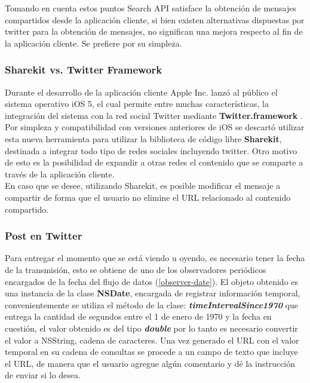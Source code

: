 Tomando en cuenta estos puntos Search API satisface la obtención de mensajes compartidos desde la aplicación cliente, si bien existen alternativas dispuestas por twitter para la obtención de mensajes, no significan una mejora respecto al fin de la aplicación cliente. Se prefiere por su simpleza.
		
		\subsubsection{Sharekit vs. Twitter Framework}
Durante el desarrollo de la aplicación cliente Apple Inc. lanzó al público el sistema operativo iOS 5, el cual permite entre muchas características, la integración del sistema con la red social Twitter mediante \textbf{Twitter.framework} . Por simpleza y compatibilidad con versiones anteriores de iOS se descartó utilizar esta nueva herramienta para utilizar la biblioteca de código libre \textbf{Sharekit}\cite{library-sharekit}, destinada a integrar todo tipo de redes sociales incluyendo twitter. Otro motivo de esto es la posibilidad de expandir a otras redes el contenido que se comparte a través de la aplicación cliente. \\

En caso que se desee, utilizando Sharekit, es posible modificar el mensaje a compartir de forma que el usuario no elimine el URL relacionado al contenido compartido.

		\subsubsection{Post en Twitter}
		Para entregar el momento que se está viendo u oyendo, es necesario tener la fecha de la transmisión, esto se obtiene de uno de los observadores periódicos encargados de la fecha del flujo de datos (\ref{observer-date}). El objeto obtenido es una instancia de la clase \textbf{NSDate}, encargada de registrar información temporal, convenientemente se utiliza el método de la clase: \textit{\textbf{timeIntervalSince1970}} que entrega la cantidad de segundos entre el 1 de enero de 1970 y la fecha en cuestión, el valor obtenido es del tipo \textbf{\textit{double}} por lo tanto es necesario convertir el valor a NSString, cadena de caracteres. Una vez generado el URL con el valor temporal en su cadena de consultas se procede a un campo de texto que incluye el URL, de manera que el usuario agregue algún comentario y dé la instrucción de enviar si lo desea.
		
